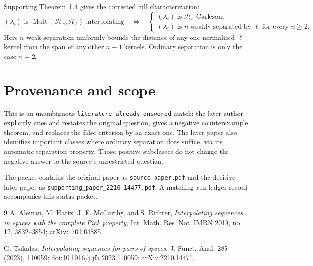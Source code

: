 \documentclass[11pt]{article}
\newcommand{\Hs}{\mathcal H_s}
\newcommand{\Hl}{\mathcal H_\ell}
\newcommand{\Mult}{\operatorname{Mult}}
\begin{document}
Supporting Theorem~1.4 gives the corrected full characterization:
\[
(\lambda_i)\text{ is }\Mult(\Hs,\Hl)\text{-interpolating}
\quad\Longleftrightarrow\quad
\begin{cases}
(\lambda_i)\text{ is }\Hs\text{-Carleson},\\
(\lambda_i)\text{ is }n\text{-weakly separated by }\ell
\text{ for every }n\ge2.
\end{cases}
\]
Here $n$-weak separation uniformly bounds the distance of any one normalized
$\ell$-kernel from the span of any other $n-1$ kernels.  Ordinary separation
is only the case $n=2$.

\section*{Provenance and scope}

This is an unambiguous \texttt{literature\_already\_answered} match: the later
author explicitly cites and restates the original question, gives a negative
counterexample theorem, and replaces the false criterion by an exact one.
The later paper also identifies important classes where ordinary separation
does suffice, via its automatic-separation property.  Those positive subclasses
do not change the negative answer to the source's unrestricted question.

The packet contains the original paper as \texttt{source\_paper.pdf} and the
decisive later paper as \texttt{supporting\_paper\_2210.14477.pdf}.  A matching
run-ledger record accompanies this status packet.

\begin{thebibliography}{9}
A. Aleman, M. Hartz, J. E. McCarthy, and S. Richter,
\emph{Interpolating sequences in spaces with the complete Pick property},
Int. Math. Res. Not. IMRN 2019, no. 12, 3832--3854;
\href{https://arxiv.org/abs/1701.04885}{arXiv:1701.04885}.

G. Tsikalas,
\emph{Interpolating sequences for pairs of spaces},
J. Funct. Anal. 285 (2023), 110059;
\href{https://doi.org/10.1016/j.jfa.2023.110059}{doi:10.1016/j.jfa.2023.110059};
\href{https://arxiv.org/abs/2210.14477}{arXiv:2210.14477}.
\end{thebibliography}
\end{document}
